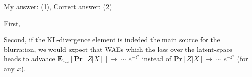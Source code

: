 \documentclass{article}
\newcommand{\inb}[1]{ \color{blue}#1 \color{black} }
\begin{document}
\inb{ My answer: (1), Correct answer: (2)}. 

First, 

Second, if the KL-divergence element is indeded the main source for the blurration, we would expect that WAEs which the loss over the latent-space heads to advance $\mathbf{E}_{\sim x} \left[ \mathbf{Pr} \left[  Z | X \right]    \right] \rightarrow \sim e^{-z^{2}} $ instead of $ \mathbf{Pr} \left[  Z | X \right] \rightarrow \sim e^{-z^{2}} $ (for any $x$). 
\end{document}
